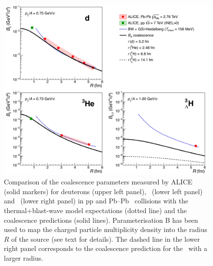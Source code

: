 \begin{figure}[htbp]
	\begin{center}
		\includegraphics[width=\textwidth]{../compareThermalAndCoalescence.png}
		\caption{Comparison of the coalescence parameters measured by ALICE (solid markers) for deuterons (upper left panel), \hethree\ (lower left panel) and \hthreelambda\ (lower right panel) in pp \cite{ALICE:nucleipp2017} and Pb--Pb~\cite{ALICE:deuteronppPbPb2015, Adam:2015yta} collisions with the  thermal+blast-wave model expectations (dotted line) and the coalescence predictions (solid lines). Parameterisation B has been used to map the charged particle multiplicity density into the radius $R$ of the source (see text for details). The dashed line in the lower right panel corresponds to the coalescence prediction for the \hthreelambda\ with a larger radius.}
		\label{fig:CompareThermalAndCoalescence}
	\end{center}
\end{figure}


